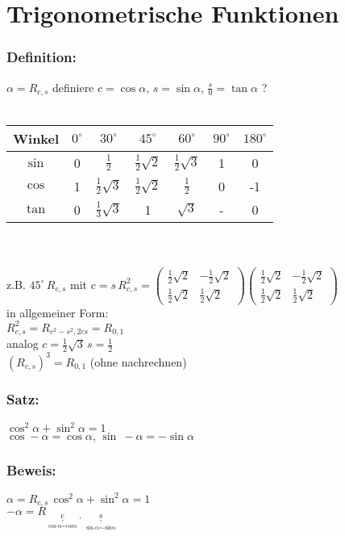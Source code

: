 \section{Trigonometrische Funktionen}
%
%
%
\subsubsection{Definition:}
$\alpha = R_{c,s}$ definiere $c=\cos \alpha, \, s=\sin\alpha, \, \frac{s}{0}=\tan\alpha$ \huge{\textcolor{pred}{?}}\normalsize{}\\
%
%
%
%
\qquad\\
 \begin{tabular}{|c|c|c|c|c|c|c|}
 \hline
Winkel & $0^{\circ}$ & $30^{\circ}$ & $45^{\circ}$ & $60^{\circ}$ & $90^{\circ}$ & $180^{\circ}$\\\hline
$\sin$ & 0 & $\frac{1}{2}$ & $\frac{1}{2}\sqrt{2}$ & $\frac{1}{2} \sqrt{3}$ & 1 & 0\\\hline
$\cos$ & 1 & $\frac{1}{2} \sqrt{3}$ &$\frac{1}{2}\sqrt{2}$ &  $\frac{1}{2}$  & 0 & -1\\\hline
$\tan$ & 0 &$\frac{1}{3}\sqrt{3}$ & 1 & $\sqrt{3}$ & - & 0 \\\hline
 \end{tabular}\\
 \qquad\\
 z.B. $45^{\circ} \, R_{c,s}$ mit $c=s \, R^{2}_{c,s} = \begin{pmatrix} \frac{1}{2}\sqrt{2} & - \frac{1}{2}\sqrt{2} \\ \frac{1}{2}\sqrt{2} & \frac{1}{2}\sqrt{2} \end{pmatrix}\begin{pmatrix} \frac{1}{2}\sqrt{2} & - \frac{1}{2}\sqrt{2} \\ \frac{1}{2}\sqrt{2} & \frac{1}{2}\sqrt{2} \end{pmatrix}$ \\
 in allgemeiner Form:\\
 $ R^{2}_{c,s} = R_{c^{2}-s^{2},2cs}=R_{0,1}$\\
 analog $ c= \frac{1}{2}\sqrt{3} \, s=\frac{1}{2}$\\
 $(R_{c,s})^{3} = R_{0,1}$ (ohne nachrechnen)
 \subsubsection{Satz:}
 $\cos^{2}\alpha + \sin^{2}\alpha =1$\\
 $\cos -\alpha=\cos\alpha, \, \sin\ -\alpha=-\sin\alpha$
%
 \subsubsection{Beweis:}
 $\alpha = R_{c,s} \, \cos^{2}\alpha+\sin^{2}\alpha=1$\\
 $-\alpha=R_{\mathop{c}\limits_{\mathop{\cos-\alpha = \cos \alpha}\limits^{\uparrow}}, \, \mathop{s}\limits_{\mathop{\sin-\alpha = -\sin\alpha}\limits^{\uparrow}}}$\\
